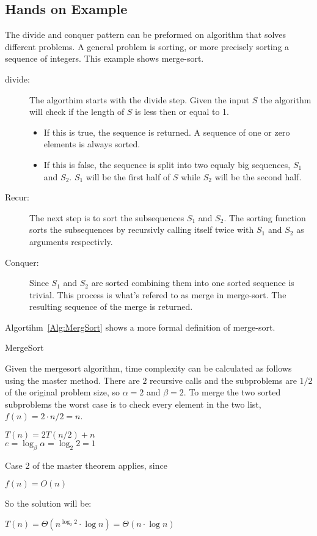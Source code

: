 \subsection{Hands on Example}
The divide and conquer pattern can be preformed on algorithm that solves
different problems. A general problem is sorting, or more precisely sorting a
sequence of integers. This example shows merge-sort.

\begin{description}
\item[divide:] The algorthim starts with the divide step. Given the input $S$
the algorithm will check if the length of $S$ is less then or equal to 1.
\begin{itemize}
\item If this is true, the sequence is returned. A sequence of one or zero
elements is always sorted.
\item If this is false, the sequence is split into two equaly big sequences,
$S_1$ and $S_2$. $S_1$ will be the first half of $S$ while $S_2$ will be the
second half.
\end{itemize}
\item[Recur:] The next step is to sort the subsequences $S_1$ and $S_2$. The
sorting function sorts the subsequences by recursivly calling itself twice with
$S_1$ and $S_2$ as arguments respectivly.
\item[Conquer:] Since $S_1$ and $S_2$ are sorted combining them into one sorted
sequence is trivial. This process is what's refered to as merge in merge-sort.
The resulting sequence of the merge is returned.
\end{description}
Algortihm~\ref{Alg:MergSort} shows a more formal definition of merge-sort.

\begin{algorithm}
\DontPrintSemicolon
{}
\caption{MergeSort}
\label{Alg:MergSort}
\end{algorithm}

Given the mergesort algorithm, time complexity can be calculated as follows
using the master method. There are $2$ recursive calls and the subproblems are
$1/2$ of the original problem size, so $\alpha=2$ and $\beta=2$. To merge the
two sorted subproblems the worst case is to check every element in the two list,
$f(n) = 2 \cdot n/2 = n$.
\begin{center}
$T(n) = 2T(n/2) + n$\\
$e=\log_\beta\alpha=\log_2 2=1$
\end{center}
Case 2 of the master theorem applies, since
\begin{center}
$f(n) = O(n)$
\end{center}
So the solution will be:
\begin{center}
$T(n) = \Theta(n^{\log_2 2} \cdot \log n) = \Theta(n \cdot \log n)$
\end{center}

